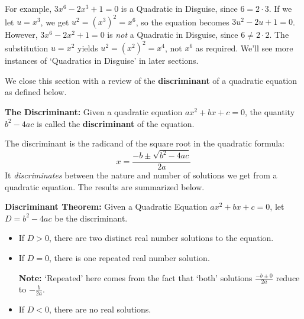 \documentclass{ximera}
\begin{document}
For example, $3x^6 - 2x^3 + 1 = 0$ is a Quadratic in Disguise, since $6 = 2 \cdot 3$.  If we let $u = x^3$, we get $u^2 = (x^3)^2 = x^6$, so the equation becomes $3u^2 - 2u + 1 = 0$.  However, $3x^6 - 2x^2 + 1 = 0$ is \textit{not} a Quadratic in Disguise, since $6 \neq 2\cdot 2$. The substitution $u = x^2$ yields $u^2 = (x^2)^2 = x^4$, not $x^6$ as required.  We'll see more instances of `Quadratics in Disguise' in later sections.

We close this section with a review of the \textbf{discriminant} of a quadratic equation as defined below.

\begin{definition} \textbf{The Discriminant:} Given a quadratic equation $ax^2 + bx + c = 0$, the quantity $b^2 - 4ac$ is called the \textbf{discriminant} of the equation.

\end{definition}

The discriminant is the radicand of the square root in the quadratic formula:  \[x  = \frac{-b \pm \sqrt{b^2 - 4ac}}{2a} \] It \textit{discriminates} between the nature and number of solutions we get from a quadratic equation.   The results are summarized below. 

\begin{theorem} \textbf{Discriminant Theorem:} \label{discriminanttheoremrealversion} Given a Quadratic Equation $ax^2 + bx + c = 0$, let $D = b^2 - 4ac$ be the discriminant.

\begin{itemize}

\item  If $D > 0$, there are two distinct real number solutions to the equation. 

\item  If $D = 0$, there is one repeated real number solution.  

\textbf{Note:}  `Repeated' here comes from the fact that `both' solutions $\frac{-b \pm 0}{2a}$ reduce to $-\frac{b}{2a}$.

\item  If $D < 0$, there are no real solutions.

\end{itemize}

\end{theorem}
\end{document}
